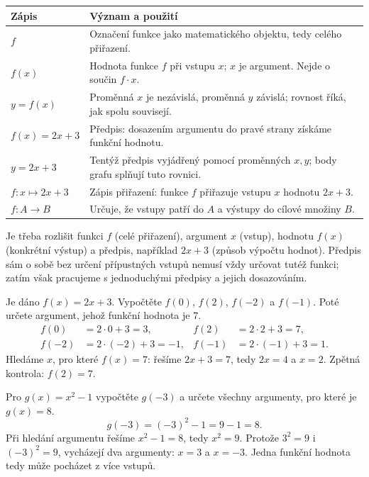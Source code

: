 \documentclass[11pt,a4paper]{article}
\begin{document}
\begin{center}
\small
\begin{tabularx}{\linewidth}{@{}p{35mm}X@{}}
\toprule
Zápis & Význam a použití\\
\midrule
$f$ & Označení funkce jako matematického objektu, tedy celého přiřazení.\\
$f(x)$ & Hodnota funkce $f$ při vstupu $x$; $x$ je argument. Nejde o součin $f\cdot x$.\\
$y=f(x)$ & Proměnná $x$ je nezávislá, proměnná $y$ závislá; rovnost říká, jak spolu souvisejí.\\
$f(x)=2x+3$ & Předpis: dosazením argumentu do pravé strany získáme funkční hodnotu.\\
$y=2x+3$ & Tentýž předpis vyjádřený pomocí proměnných $x,y$; body grafu splňují tuto rovnici.\\
$f\colon x\mapsto 2x+3$ & Zápis přiřazení: funkce $f$ přiřazuje vstupu $x$ hodnotu $2x+3$.\\
$f\colon A\to B$ & Určuje, že vstupy patří do $A$ a výstupy do cílové množiny $B$.\\
\bottomrule
\end{tabularx}
\end{center}

Je třeba rozlišit funkci $f$ (celé přiřazení), argument $x$ (vstup), hodnotu $f(x)$ (konkrétní výstup) a předpis, například $2x+3$ (způsob výpočtu hodnot). Předpis sám o sobě bez určení přípustných vstupů nemusí vždy určovat tutéž funkci; zatím však pracujeme s jednoduchými předpisy a jejich dosazováním.

\begin{prikladReseniBox}
Je dáno $f(x)=2x+3$. Vypočtěte $f(0)$, $f(2)$, $f(-2)$ a $f(-1)$. Poté určete argument, jehož funkční hodnota je $7$.
\tcblower
\begin{align*}
f(0)&=2\cdot0+3=3, & f(2)&=2\cdot2+3=7,\\
f(-2)&=2\cdot(-2)+3=-1, & f(-1)&=2\cdot(-1)+3=1.
\end{align*}
Hledáme $x$, pro které $f(x)=7$: řešíme $2x+3=7$, tedy $2x=4$ a $x=2$. Zpětná kontrola: $f(2)=7$.
\end{prikladReseniBox}

\begin{prikladReseniBox}
Pro $g(x)=x^2-1$ vypočtěte $g(-3)$ a určete všechny argumenty, pro které je $g(x)=8$.
\tcblower
\[
g(-3)=(-3)^2-1=9-1=8.
\]
Při hledání argumentu řešíme $x^2-1=8$, tedy $x^2=9$. Protože $3^2=9$ i $(-3)^2=9$, vycházejí dva argumenty: $x=3$ a $x=-3$. Jedna funkční hodnota tedy může pocházet z více vstupů.
\end{prikladReseniBox}
\end{document}
